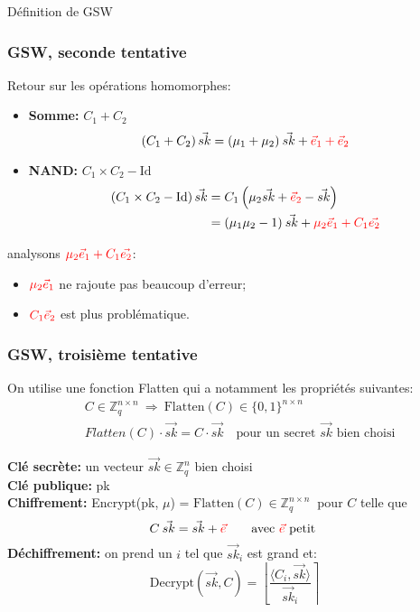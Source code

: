 \documentclass[10pt,xcolor={usenames,dvipsnames}]{beamer}
\newcommand{\ZZq}{\mathbb{Z}_q}
\begin{document}
\begin{section}{Définition de GSW}


\begin{frame} 
\frametitle{GSW, seconde tentative}
Retour sur les opérations homomorphes:
\begin{itemize}
\item \textbf{Somme:} $C_1 + C_2\quad$
\[\left(C_1 + C_2\right) \vec{sk} = (\mu_1 + \mu_2)\: \vec{sk} + {\color{red}\vec{e}_1 + \vec{e}_2}\]
\item \textbf{NAND:} $C_1 \times C_2 - \text{Id}$
\begin{align*}
\left(C_1 \times C_2 - \text{Id}\right) \vec{sk} &= C_1\left(\mu_2\vec{sk} + {\color{red}\vec{e}_2} - \vec{sk}\right) \\
&= (\mu_1 \mu_2 - 1)\: \vec{sk} + {\color{red}\mu_2 \vec{e}_1 + C_1 \vec{e_2}}
\end{align*}
\end{itemize}


analysons $\color{red}\mu_2 \vec{e}_1 + C_1 \vec{e_2}$:
\begin{itemize}
\item $\color{red}\mu_2 \vec{e}_1$ ne rajoute pas beaucoup d'erreur;
\item $\color{red}C_1 \vec{e}_2$ est plus problématique.
\end{itemize}

\end{frame} 

  
\begin{frame} 
\frametitle{GSW, troisième tentative}
On utilise une fonction Flatten qui a notamment les propriétés suivantes:
\begin{align*}
&C \in \ZZq^{n \times n}\: \Longrightarrow \:\text{Flatten}(C) \in \{0,1\}^{n \times n} \\
& Flatten(C)\cdot \vec{sk} = C\cdot \vec{sk} \quad\text{pour un secret }\vec{sk}\text{ bien choisi}
\end{align*}

\textbf{Clé secrète:} un vecteur $\vec{sk} \in \ZZq^{n}$ bien choisi\\
\textbf{Clé publique:} pk\\
\textbf{Chiffrement:} Encrypt(pk, $\mu$) = $\text{Flatten}(C)\in \ZZq^{n \times n}\:$ pour $C$ telle que  
\[C \:\vec{sk} = \vec{sk} + {\color{red}\vec{e}}\qquad \text{avec }  {\color{red}\vec{e}} \text{ petit} \]
\textbf{Déchiffrement:} on prend un $i$ tel que $\vec{sk}_i$ est grand et:
\[\text{Decrypt}(\vec{sk}, C) = \left\lfloor \frac{\langle C_i, \vec{sk}\rangle}{\vec{sk}_i} \right\rceil \]


\end{frame}
\end{section}
\end{document}
